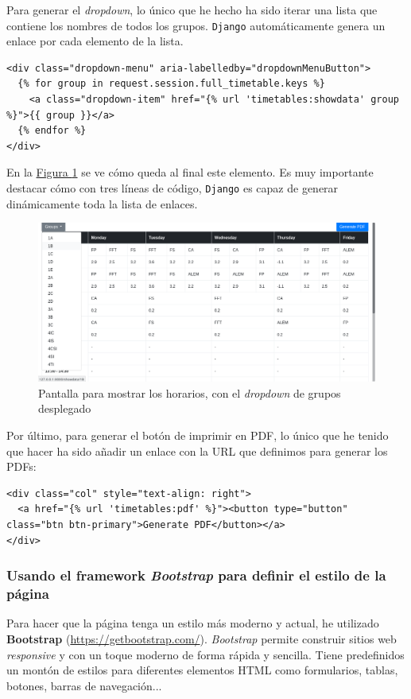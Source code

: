 {Para generar el \textit{dropdown}, lo único que he hecho ha sido iterar una lista que contiene los nombres de todos los grupos. \texttt{Django} automáticamente genera un enlace por cada elemento de la lista.

\begin{verbatim}
<div class="dropdown-menu" aria-labelledby="dropdownMenuButton">
  {% for group in request.session.full_timetable.keys %}
    <a class="dropdown-item" href="{% url 'timetables:showdata' group %}">{{ group }}</a>
  {% endfor %}
</div>
\end{verbatim}

En la \hyperref[dropdowngrupos]{Figura \ref*{dropdowngrupos}} se ve cómo queda al final este elemento. Es muy importante destacar cómo con tres líneas de código, \texttt{Django} es capaz de generar dinámicamente toda la lista de enlaces.

\begin{figure}
  \centering
  \includegraphics[width=\textwidth]{img/horario_horario_grupos}
  \caption{Pantalla para mostrar los horarios, con el \textit{dropdown} de grupos desplegado}
  \label{dropdowngrupos}
\end{figure}

Por último, para generar el botón de imprimir en PDF, lo único que he tenido que hacer ha sido añadir un enlace con la URL que definimos para generar los PDFs:

\begin{verbatim}
<div class="col" style="text-align: right">
  <a href="{% url 'timetables:pdf' %}"><button type="button" class="btn btn-primary">Generate PDF</button></a>
</div>
\end{verbatim}

\subsubsection{Usando el framework \textit{Bootstrap} para definir el estilo de la página}
Para hacer que la página tenga un estilo más moderno y actual, he utilizado \textbf{Bootstrap} (\url{https://getbootstrap.com/}). \textit{Bootstrap} permite construir sitios web \textit{responsive} y con un toque moderno de forma rápida y sencilla. Tiene predefinidos un montón de estilos para diferentes elementos HTML como formularios, tablas, botones, barras de navegación...

}
